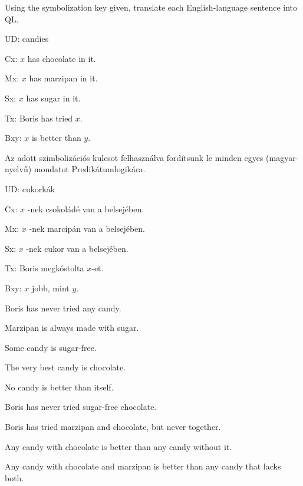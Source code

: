 
\solutions
\problempart
\label{pr.QLcandies}
Using the symbolization key given, translate each English-language sentence into QL.
\begin{ekey}
\item[UD:] candies
\item[Cx:] $x$ has chocolate in it.
\item[Mx:] $x$ has marzipan in it.
\item[Sx:] $x$ has sugar in it.
\item[Tx:] Boris has tried $x$.
\item[Bxy:] $x$ is better than $y$.
\end{ekey}

\solutions
\problempart
\label{pr.QLcandies}
Az adott szimbolizációs kulcsot felhasználva fordítsunk le minden egyes (magyar-nyelvű) mondatot Predikátumlogikára.
\begin{ekey}
\item[UD:] cukorkák
\item[Cx:] $x$ -nek csokoládé van a belsejében.
\item[Mx:] $x$ -nek marcipán van a belsejében.
\item[Sx:] $x$ -nek cukor van a belsejében.
\item[Tx:] Boris megkóstolta $x$-et.
\item[Bxy:] $x$ jobb, mint $y$.
\end{ekey}

\begin{earg}
\item Boris has never tried any candy.
\item Marzipan is always made with sugar.
\item Some candy is sugar-free.
\item The very best candy is chocolate.
\item No candy is better than itself.
\item Boris has never tried sugar-free chocolate.
\item Boris has tried marzipan and chocolate, but never together.
\item Any candy with chocolate is better than any candy without it.
\item Any candy with chocolate and marzipan is better than any candy that lacks both.
\end{earg}



